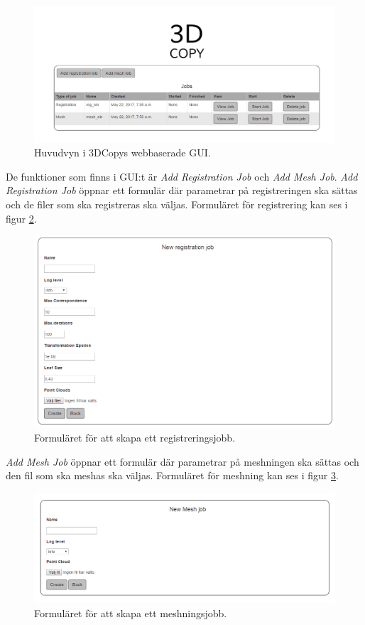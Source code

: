 \begin{figure}[H]
	\centering
	\includegraphics[width=130mm]{figures/3DCopyGUIWeb.PNG}
	\caption{Huvudvyn i 3DCopys webbaserade GUI.}
	\label{fig:3DCopyGUIWeb}
\end{figure}

De funktioner som finns i GUI:t är \textit{Add Registration Job} och \textit{Add Mesh Job}. \textit{Add Registration Job} öppnar ett formulär där parametrar på registreringen ska sättas och de filer som ska registreras ska väljas. Formuläret för registrering kan ses i figur \ref{fig:3DCopyGUIRegJobForm}.

\begin{figure}[H]
	\centering
	\includegraphics[width=130mm]{figures/3DCopyGUIRegJobForm.PNG}
	\caption{Formuläret för att skapa ett registreringsjobb.}
	\label{fig:3DCopyGUIRegJobForm}
\end{figure}

\textit{Add Mesh Job} öppnar ett formulär där parametrar på meshningen ska sättas och den fil som ska meshas ska väljas. Formuläret för meshning kan ses i figur \ref{fig:3DCopyGUIMeshJobForm}.

\begin{figure}[H]
	\centering
	\includegraphics[width=130mm]{figures/3DCopyGUIMeshJobForm.PNG}
	\caption{Formuläret för att skapa ett meshningsjobb.}
	\label{fig:3DCopyGUIMeshJobForm}
\end{figure}

